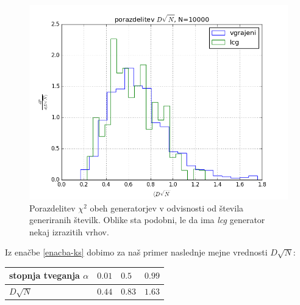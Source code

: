 \documentclass[slovene,11pt,a4paper]{article}
\numberwithin{equation}{section} %
\numberwithin{figure}{section} %
\numberwithin{table}{section} %
\begin{document}
\begin{figure}[h]
\begin{minipage}{0.5\textwidth}
\includegraphics[scale=0.4]{slike/potazdelitev_DsqrtN_10000.png}
\end{minipage}\hfill

\caption{Porazdelitev $\chi^2$ obeh generatorjev v odvisnosti od števila generiranih številk. Oblike sta podobni, le da ima \textit{lcg} generator nekaj izrazitih vrhov.}
\end{figure}

Iz enačbe \ref{enacba-ks} dobimo za naš primer naslednje mejne vrednosti $D\sqrt{N}$:

\begin{table}[!h]
\begin{center}
\begin{tabular}{|l|l|l|l|}
\hline
stopnja tveganja $\alpha$ & $0.01$ & $0.5$ & $0.99$ \\ \hline
$D\sqrt{N}$ & $0.44$ & $0.83$ & $1.63$ \\ \hline
\end{tabular}
\end{center}
\end{table}
\end{document}
